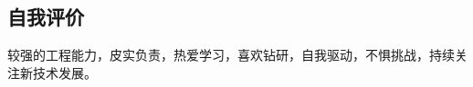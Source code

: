 \documentclass[line,margin,UTF8]{res}
\begin{document}
\begin{resume}
 
%




 \section{自我评价}
较强的工程能力，皮实负责，热爱学习，喜欢钻研，自我驱动，不惧挑战，持续关注新技术发展。

 
\end{resume}    
\end{document}
